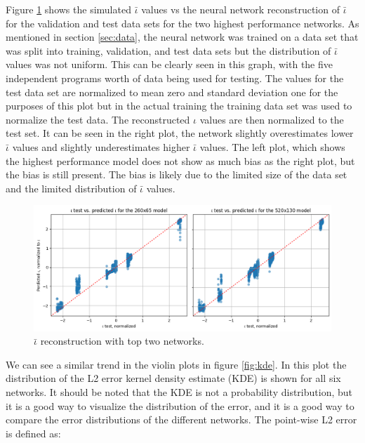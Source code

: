 Figure \ref{fig:iota_vs_pred} shows the simulated $\bar{\iota}$ values vs the neural network reconstruction of $\bar{\iota}$ for the validation and test data sets for the two highest performance networks. As mentioned in section \ref{sec:data}, the neural network was trained on a data set that was split into training, validation, and test data sets but the distribution of $\bar{\iota}$ values was not uniform. This can be clearly seen in this graph, with the five independent programs worth of data being used for testing. The values for the test data set are normalized to mean zero and standard deviation one for the purposes of this plot but in the actual training the training data set was used to normalize the test data. The reconstructed $\iota$ values are then normalized to the test set. It can be seen in the right plot, the network slightly overestimates lower $\bar{\iota}$ values and slightly underestimates higher $\bar{\iota}$ values. The left plot, which shows the highest performance model does not show as much bias as the right plot, but the bias is still present. The bias is likely due to the limited size of the data set and the limited distribution of $\bar{\iota}$ values.


\begin{figure}[!htb]
    \centering
    \includegraphics[width = \textwidth]{images/iota_vs_pred.png}
    \caption{$\bar{\iota}$ reconstruction with top two networks.} \label{fig:iota_vs_pred}
\end{figure}

We can see a similar trend in the violin plots in figure \ref{fig:kde}. In this plot the distribution of the L2 error kernel density estimate (KDE) is shown for all six networks. It should be noted that the KDE is not a probability distribution, but it is a good way to visualize the distribution of the error, and it is a good way to compare the error distributions of the different networks. The point-wise L2 error is defined as:

